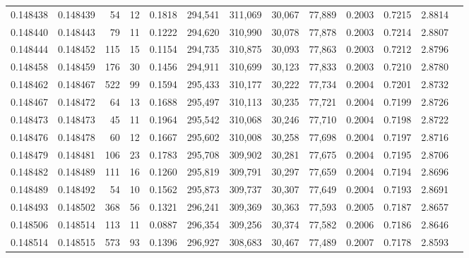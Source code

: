 \begin{tabular}{rrrrrrrrrrrrr}
0.148438 & 0.148439 &    54 &  12 &                                     0.1818 & 294,541 & 311,069 &  30,067 &  77,889 & 0.2003 & 0.7215 & 2.8814 \\
0.148440 & 0.148443 &    79 &  11 &                                     0.1222 & 294,620 & 310,990 &  30,078 &  77,878 & 0.2003 & 0.7214 & 2.8807 \\
0.148444 & 0.148452 &   115 &  15 &                                     0.1154 & 294,735 & 310,875 &  30,093 &  77,863 & 0.2003 & 0.7212 & 2.8796 \\
0.148458 & 0.148459 &   176 &  30 &                                     0.1456 & 294,911 & 310,699 &  30,123 &  77,833 & 0.2003 & 0.7210 & 2.8780 \\
0.148462 & 0.148467 &   522 &  99 &                                     0.1594 & 295,433 & 310,177 &  30,222 &  77,734 & 0.2004 & 0.7201 & 2.8732 \\
0.148467 & 0.148472 &    64 &  13 &                                     0.1688 & 295,497 & 310,113 &  30,235 &  77,721 & 0.2004 & 0.7199 & 2.8726 \\
0.148473 & 0.148473 &    45 &  11 &                                     0.1964 & 295,542 & 310,068 &  30,246 &  77,710 & 0.2004 & 0.7198 & 2.8722 \\
0.148476 & 0.148478 &    60 &  12 &                                     0.1667 & 295,602 & 310,008 &  30,258 &  77,698 & 0.2004 & 0.7197 & 2.8716 \\
0.148479 & 0.148481 &   106 &  23 &                                     0.1783 & 295,708 & 309,902 &  30,281 &  77,675 & 0.2004 & 0.7195 & 2.8706 \\
0.148482 & 0.148489 &   111 &  16 &                                     0.1260 & 295,819 & 309,791 &  30,297 &  77,659 & 0.2004 & 0.7194 & 2.8696 \\
0.148489 & 0.148492 &    54 &  10 &                                     0.1562 & 295,873 & 309,737 &  30,307 &  77,649 & 0.2004 & 0.7193 & 2.8691 \\
0.148493 & 0.148502 &   368 &  56 &                                     0.1321 & 296,241 & 309,369 &  30,363 &  77,593 & 0.2005 & 0.7187 & 2.8657 \\
0.148506 & 0.148514 &   113 &  11 &                                     0.0887 & 296,354 & 309,256 &  30,374 &  77,582 & 0.2006 & 0.7186 & 2.8646 \\
0.148514 & 0.148515 &   573 &  93 &                                     0.1396 & 296,927 & 308,683 &  30,467 &  77,489 & 0.2007 & 0.7178 & 2.8593 \\

\end{tabular}
